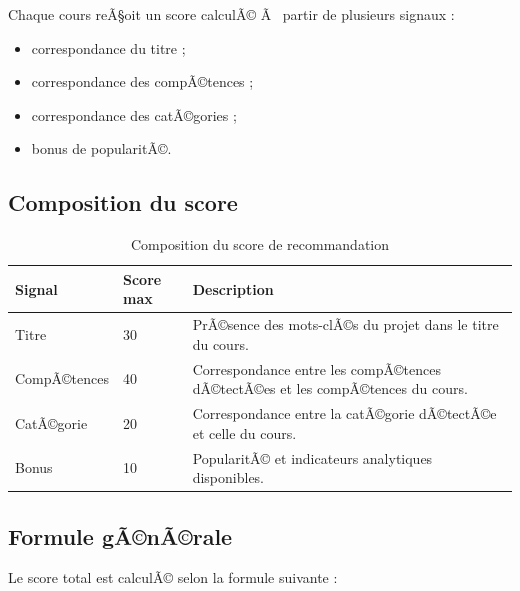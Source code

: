 ﻿\documentclass[12pt,a4paper]{report}
\begin{document}
Chaque cours reÃ§oit un score calculÃ© Ã  partir de plusieurs signaux :
\begin{itemize}
    \item correspondance du titre ;
    \item correspondance des compÃ©tences ;
    \item correspondance des catÃ©gories ;
    \item bonus de popularitÃ©.
\end{itemize}

\subsection{Composition du score}

\begin{table}[H]
    \centering
    \caption{Composition du score de recommandation}

    \begin{tabular}{|p{4cm}|p{3cm}|p{7cm}|}
        \hline
        \textbf{Signal} & \textbf{Score max} & \textbf{Description} \\
        \hline

        Titre &
        30 &
        PrÃ©sence des mots-clÃ©s du projet dans le titre du cours. \\
        
        \hline

        CompÃ©tences &
        40 &
        Correspondance entre les compÃ©tences dÃ©tectÃ©es et les compÃ©tences du cours. \\
        
        \hline

        CatÃ©gorie &
        20 &
        Correspondance entre la catÃ©gorie dÃ©tectÃ©e et celle du cours. \\
        
        \hline

        Bonus &
        10 &
        PopularitÃ© et indicateurs analytiques disponibles. \\
        
        \hline
    \end{tabular}
\end{table}

\subsection{Formule gÃ©nÃ©rale}

Le score total est calculÃ© selon la formule suivante :
\end{document}
